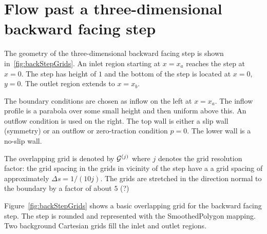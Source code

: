 \documentclass[11pt]{article}
\begin{document}
\section{Flow past a three-dimensional backward facing step}

The geometry of the three-dimensional backward facing step is shown in~\ref{fig:backStepGrids}. 
An inlet region starting at $x=x_a$ reaches the step at $x=0$. The step has height of $1$ and the bottom
of the step is located at $x=0$, $y=0$. The outlet region extends to $x=x_b$. 

The boundary conditions are chosen as inflow on the left at $x=x_a$. The inflow profile is a parabola
over some small height and then uniform above this. An outflow condition is used on the right.
The top wall is either a slip wall (symmetry) or an outflow or zero-traction condition $p=0$. 
The lower wall is a no-slip wall.


The overlapping grid is denoted by ${\mathcal G}^{(j)}$ where $j$ denotes the grid resolution factor: the grid spacing in the 
grids in vicinity of the step have a a grid spacing of approximately $\Delta s = 1/(10 j)$. The grids are stretched
in the direction normal to the boundary by a factor of about $5$ (?)

Figure~\ref{fig:backStepGrids} shows a basic overlapping grid for the backward facing step.
The step is rounded and represented with the SmoothedPolygon mapping.
Two background Cartesian grids fill the inlet and outlet regions.

\end{document}
